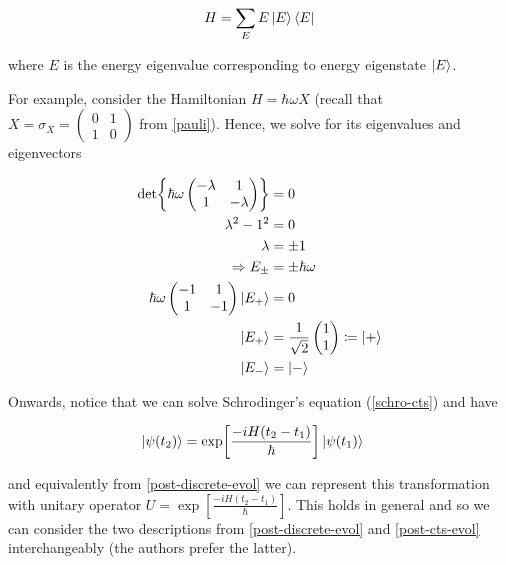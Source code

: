 \documentclass[11pt]{article}
\newcommand\0{\mathbf{0}}
\newcommand\<{\langle}
\renewcommand\>{\rangle}
\renewcommand\implies{\Rightarrow}
\begin{document}
\begin{align*}
H = \sum_{E} E \ket{E}\bra{E}	
\end{align*}

where $E$ is the energy eigenvalue corresponding to energy eigenstate $\ket{E}$. 

For example, consider the Hamiltonian $H = \hbar \omega X$  (recall that $X = \sigma_X = \begin{pmatrix} 0 & 1 \\ 1 & 0\end{pmatrix}$ from \ref{pauli}). Hence, we solve for its eigenvalues and eigenvectors

\begin{align*}
	\det{ \hbar\omega\begin{pmatrix} -\lambda & 1 \\ 1 & -\lambda\end{pmatrix}} &= 0 \\
	\lambda^2 - 1^2 &= 0 \\
	\lambda &= \pm 1 \\
	\implies E_{\pm} &= \pm \hbar \omega \\
	\hbar\omega\begin{pmatrix} -1 & 1 \\ 1 & -1\end{pmatrix}\ket{E_+} &= 0 \\
	\ket{E_+} &= \frac{1}{\sqrt{2}}\begin{pmatrix}
		1 \\ 1
	\end{pmatrix} \coloneqq \ket{+} \\
	\ket{E_-} &= \ket{-}
\end{align*}

Onwards, notice that we can solve Schrodinger's equation (\ref{schro-cts}) and have

\begin{align*}
	\ket{\psi(t_2)} &= \exp[\frac{-iH(t_2 - t_1)}{\hbar}] \ket{\psi(t_1)}
\end{align*}

and equivalently from \ref{post-discrete-evol} we can represent this transformation with unitary operator $U = \exp[\frac{-iH(t_2 - t_1)}{\hbar}]$. This holds in general and so we can consider the two descriptions from \ref{post-discrete-evol} and \ref{post-cts-evol} interchangeably (the authors prefer the latter). 
\end{document}
